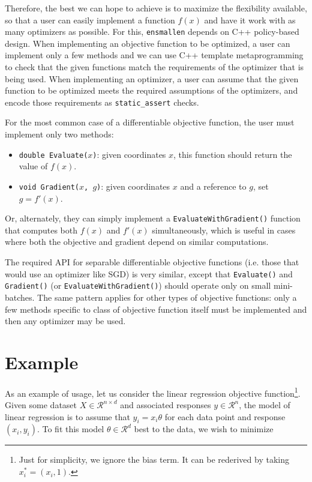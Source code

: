 \documentclass{article}
\begin{document}
Therefore, the best we can hope to achieve is to maximize the flexibility
available, so that a user can easily implement a function $f(x)$ and have it
work with as many optimizers as possible.  For this, {\tt ensmallen} depends on
C++ policy-based design.  When implementing an objective function to be
optimized, a user can implement only a few methods and we can use C++ template
metaprogramming to check that the given functions match the requirements of the
optimizer that is being used.  When implementing an optimizer, a user can assume
that the given function to be optimized meets the required assumptions of the
optimizers, and encode those requirements as \texttt{static\_assert} checks.

For the most common case of a differentiable objective function, the user must
implement only two methods:

\begin{itemize}
  \item \texttt{double Evaluate($x$)}: given coordinates $x$, this function
should return the value of $f(x)$.
  \item \texttt{void Gradient($x$, $g$)}: given coordinates $x$ and a reference
to $g$, set $g = f'(x)$.
\end{itemize}

Or, alternately, they can simply implement a \texttt{EvaluateWithGradient()}
function that computes both $f(x)$ and $f'(x)$ simultaneously, which is useful
in cases where both the objective and gradient depend on similar computations.

The required API for separable differentiable objective functions (i.e. those
that would use an optimizer like SGD) is very similar, except that
\texttt{Evaluate()} and \texttt{Gradient()} (or \texttt{EvaluateWithGradient()})
should operate only on small mini-batches.  The same pattern applies for other
types of objective functions: only a few methods specific to class of objective
function itself must be implemented and then any optimizer may be used.

\section{Example}

As an example of usage, let us consider the linear regression objective
function\footnote{Just for simplicity, we ignore the bias term.  It can be
rederived by taking $x^*_i = (x_i, 1)$.}.  Given some dataset $X \in
\mathcal{R}^{n \times d}$ and associated responses $y \in \mathcal{R}^n$, the
model of linear regression is to assume that $y_i = x_i \theta$ for each data
point and response $(x_i, y_i)$.  To fit this model $\theta \in \mathcal{R}^d$ best
to the data, we wish to minimize
\end{document}
